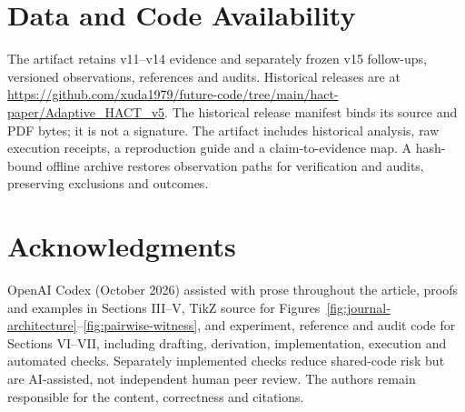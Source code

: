 \documentclass[10pt,journal,compsoc]{IEEEtran}
\theoremstyle{definition}\newtheorem{definition}[theorem]{Definition}
\begin{document}
\section*{Data and Code Availability}
The artifact retains v11--v14 evidence and separately frozen v15 follow-ups,
versioned observations, references and audits. Historical releases are at
\url{https://github.com/xuda1979/future-code/tree/main/hact-paper/Adaptive_HACT_v5}.
The historical release manifest binds its source and PDF bytes; it is not a
signature. The artifact includes historical analysis, raw execution receipts,
a reproduction guide and a claim-to-evidence map. A hash-bound offline archive
restores observation paths for verification and audits, preserving exclusions
and outcomes.
\section*{Acknowledgments}
OpenAI Codex (October 2026) assisted with prose throughout the article,
proofs and examples in Sections III--V, TikZ source for Figures~\ref{fig:journal-architecture}--\ref{fig:pairwise-witness},
and experiment, reference and audit code for Sections VI--VII, including
drafting, derivation, implementation, execution and automated checks.
Separately implemented checks reduce shared-code risk but are AI-assisted,
not independent human peer review. The authors remain responsible for the
content, correctness and citations.


\end{document}
